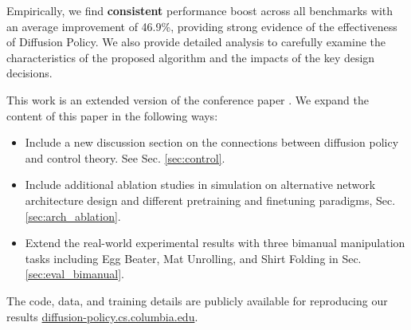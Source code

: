 Empirically, we find \textbf{consistent} performance boost across all benchmarks with an average improvement of 46.9\%, providing strong evidence of the effectiveness of Diffusion Policy. We also provide detailed analysis to carefully examine the characteristics of the proposed algorithm and the impacts of the key design decisions. 

This work is an extended version of the conference paper \cite{chi2023diffusionpolicy}.  We expand the content of this paper in the following ways: 
\begin{itemize} %
\item Include a new discussion section on the connections between diffusion policy and control theory. See Sec. \ref{sec:control}.   
\item Include additional ablation studies in simulation on alternative network architecture design and different pretraining and finetuning paradigms, Sec. \ref{sec:arch_ablation}.  
\item Extend the real-world experimental results with three bimanual manipulation tasks including  Egg Beater, Mat Unrolling, and Shirt Folding in  Sec. \ref{sec:eval_bimanual}. 
\end{itemize}

The code, data, and training details are publicly available for reproducing our results \url{diffusion-policy.cs.columbia.edu}.  
